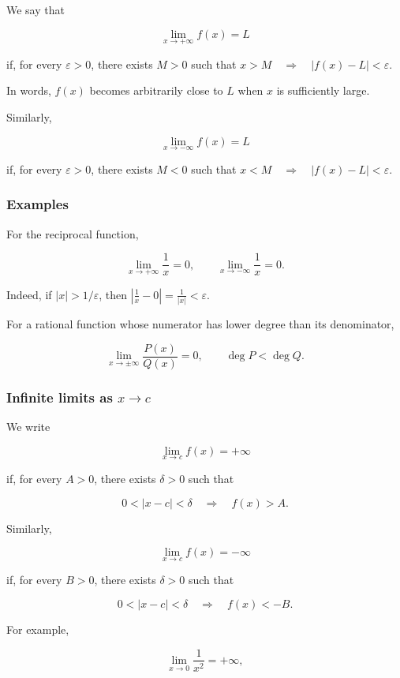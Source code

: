 \documentclass[11pt,a4paper]{article}
\begin{document}
We say that

\[
\lim_{x\to+\infty}f(x)=L
\]

if, for every \(\varepsilon>0\), there exists \(M>0\) such that
\(x>M\quad\Longrightarrow\quad |f(x)-L|<\varepsilon.\)

In words, \(f(x)\) becomes arbitrarily close to \(L\) when \(x\) is
sufficiently large.

Similarly,

\[
\lim_{x\to-\infty}f(x)=L
\]

if, for every \(\varepsilon>0\), there exists \(M<0\) such that
\(x<M\quad\Longrightarrow\quad |f(x)-L|<\varepsilon.\)

\subsubsection{Examples}\label{examples}

For the reciprocal function,

\[
\lim_{x\to+\infty}\frac{1}{x}=0,
\qquad
\lim_{x\to-\infty}\frac{1}{x}=0.
\]

Indeed, if \(|x|>1/\varepsilon\), then
\(\left|\frac{1}{x}-0\right|=\frac{1}{|x|}<\varepsilon.\)

For a rational function whose numerator has lower degree than its
denominator,

\[
\lim_{x\to\pm\infty}\frac{P(x)}{Q(x)}=0,
\qquad \deg P<\deg Q.
\]

\subsubsection{\texorpdfstring{Infinite limits as
\(x\to c\)}{Infinite limits as x\textbackslash to c}}\label{infinite-limits-as-xto-c}

We write

\[
\lim_{x\to c}f(x)=+\infty
\]

if, for every \(A>0\), there exists \(\delta>0\) such that

\[
0<|x-c|<\delta
\quad\Longrightarrow\quad
f(x)>A.
\]

Similarly,

\[
\lim_{x\to c}f(x)=-\infty
\]

if, for every \(B>0\), there exists \(\delta>0\) such that

\[
0<|x-c|<\delta
\quad\Longrightarrow\quad
f(x)<-B.
\]

For example,

\[
\lim_{x\to0}\frac{1}{x^2}=+\infty,
\]
\end{document}
